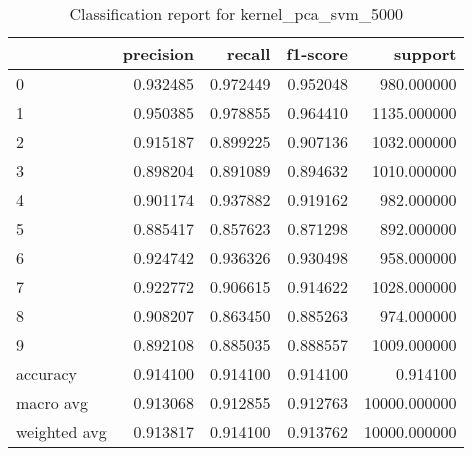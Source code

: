 \begin{table}[htb!]
\centering
\caption{Classification report for kernel_pca_svm_5000}
\label{tab:classification-report-kernel_pca_svm_5000}
\begin{tabular}{lrrrr}
\toprule
 & precision & recall & f1-score & support \\
\midrule
0 & 0.932485 & 0.972449 & 0.952048 & 980.000000 \\
1 & 0.950385 & 0.978855 & 0.964410 & 1135.000000 \\
2 & 0.915187 & 0.899225 & 0.907136 & 1032.000000 \\
3 & 0.898204 & 0.891089 & 0.894632 & 1010.000000 \\
4 & 0.901174 & 0.937882 & 0.919162 & 982.000000 \\
5 & 0.885417 & 0.857623 & 0.871298 & 892.000000 \\
6 & 0.924742 & 0.936326 & 0.930498 & 958.000000 \\
7 & 0.922772 & 0.906615 & 0.914622 & 1028.000000 \\
8 & 0.908207 & 0.863450 & 0.885263 & 974.000000 \\
9 & 0.892108 & 0.885035 & 0.888557 & 1009.000000 \\
accuracy & 0.914100 & 0.914100 & 0.914100 & 0.914100 \\
macro avg & 0.913068 & 0.912855 & 0.912763 & 10000.000000 \\
weighted avg & 0.913817 & 0.914100 & 0.913762 & 10000.000000 \\
\bottomrule
\end{tabular}
\end{table}
